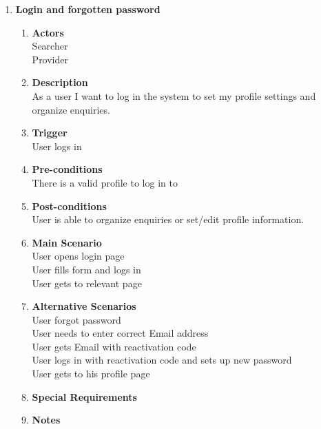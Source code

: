\documentclass{scrreprt}
\begin{document}
\begin{enumerate}
	\item \textbf{Login and forgotten password}
	\begin{enumerate}
		\item \textbf{Actors}  \\
			Searcher \\
			Provider \\

		\item \textbf{Description} \\
			As a user I want to log in the system to set my profile settings and organize enquiries. \\
			
		\item \textbf{Trigger} \\
			User logs in\\

		\item \textbf{Pre-conditions} \\
			There is a valid profile to log in to\\

		\item \textbf{Post-conditions} \\
			User is able to organize enquiries or set/edit profile information.\\

		\item \textbf{Main Scenario} \\
			User opens login page \\
			User fills form and logs in \\
			User gets to relevant page \\

		\item \textbf{Alternative Scenarios} \\
			User forgot password\\
			User needs to enter correct Email address\\
			User gets Email with reactivation code\\
			User logs in with reactivation code and sets up new password\\
			User gets to his profile page\\
		\item \textbf{Special Requirements} \\

		\item \textbf{Notes} \\
	\end{enumerate}



\end{enumerate}
\end{document}
